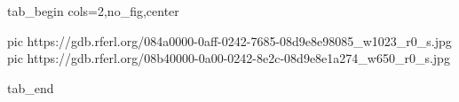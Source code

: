  
 
 
 
 


\ifcmt
  tab_begin cols=2,no_fig,center

     pic https://gdb.rferl.org/084a0000-0aff-0242-7685-08d9e8e98085_w1023_r0_s.jpg
     pic https://gdb.rferl.org/08b40000-0a00-0242-8e2c-08d9e8e1a274_w650_r0_s.jpg

  tab_end
\fi

